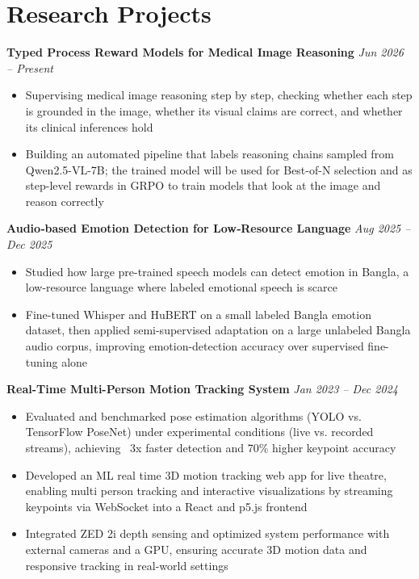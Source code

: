\documentclass[10pt,letterpaper]{article}
\newcommand{\headingsimple}[2]{%
  \noindent\textbf{#1} \hfill #2\par
}
\begin{document}
\section{Research Projects}

\headingsimple{Typed Process Reward Models for Medical Image Reasoning}{\textit{Jun 2026 -- Present}}
\begin{itemize}
  \item Supervising medical image reasoning step by step, checking whether each step is grounded in the image, whether its visual claims are correct, and whether its clinical inferences hold
  \item Building an automated pipeline that labels reasoning chains sampled from Qwen2.5-VL-7B; the trained model will be used for Best-of-N selection and as step-level rewards in GRPO to train models that look at the image and reason correctly
\end{itemize}

\headingsimple{Audio‑based Emotion Detection for Low‑Resource Language}{\textit{Aug 2025 -- Dec 2025}}
\begin{itemize}
  \item Studied how large pre-trained speech models can detect emotion in Bangla, a low-resource language where labeled emotional speech is scarce
  \item Fine-tuned Whisper and HuBERT on a small labeled Bangla emotion dataset, then applied semi-supervised adaptation on a large unlabeled Bangla audio corpus, improving emotion-detection accuracy over supervised fine-tuning alone
\end{itemize}


\headingsimple{Real-Time Multi-Person Motion Tracking System}{\textit{Jan 2023 -- Dec 2024}}
\begin{itemize}
  \item Evaluated and benchmarked pose estimation algorithms (YOLO vs. TensorFlow PoseNet) under experimental conditions (live vs. recorded streams), achieving ~3x faster detection and 70\% higher keypoint accuracy
  \item Developed an ML real time 3D motion tracking web app for live theatre, enabling multi person tracking and interactive visualizations by streaming keypoints via WebSocket into a React and p5.js frontend
  \item Integrated ZED 2i depth sensing and optimized system performance with external cameras and a GPU, ensuring accurate 3D motion data and responsive tracking in real-world settings
\end{itemize}
\end{document}
